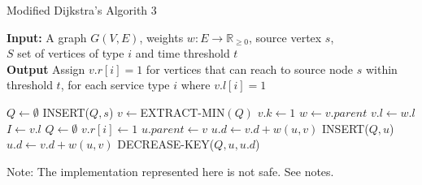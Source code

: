 \begin{algorithm}[H]
    \caption{Modified Dijkstra's Algorith 3} \label{alg:modified_dijsktra3}
    \textbf{Input:} A graph $G(V,E)$, weights $w:E\rightarrow\mathbb{R}_{\geq 0}$, source vertex $s$, \\  $S$ set of vertices of type $i$ and time threshold $t$\\
    \textbf{Output} Assign $v.r[i]=1$ for vertices that can reach to source node $s$ within threshold $t$, for each service type $i$ where $v.l[i]=1$
    \begin{algorithmic}
        \State $Q\gets\emptyset$ 
        \State INSERT($Q,s$)
            \State $v\gets$EXTRACT-MIN$(Q)$
            \State $v.k\gets1$ 
                \State $w \gets v.parent$
                \State $v.l \gets w.l$
            \EndIf
            \State $I \gets v.l$ 
                \State $Q\gets\emptyset$ 
            \Else
                    \State $v.r[i] \gets 1$
                \EndFor
                    \State $u.parent\gets v$
                        \State $u.d\gets v.d+w(u,v)$ %
                        \State INSERT($Q,u$)
                        \State $u.d\gets v.d+w(u,v)$
                        \State DECREASE-KEY($Q,u,u.d$)
                    \EndIf
                \EndFor
            \EndIf
        \EndWhile
    \end{algorithmic}
\end{algorithm}

Note: The implementation represented here is not safe. See notes.

